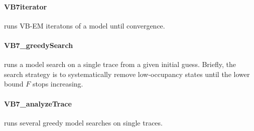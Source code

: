 \paragraph{VB7iterator} 
runs VB-EM iteratons of a model until convergence.
\paragraph{VB7\_greedySearch}
runs a model search on a single trace from a given initial
guess. Briefly, the search strategy is to systematically remove
low-occupancy states until the lower bound $F$ stops increasing.
\paragraph{VB7\_analyzeTrace}
runs several greedy model searches on single traces. 


